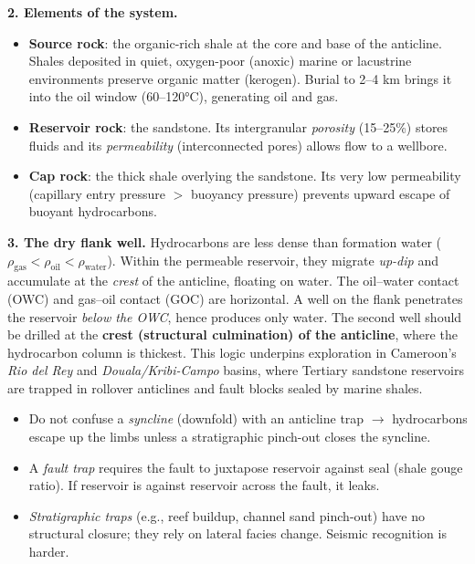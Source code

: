 \documentclass[11pt]{article}
\begin{document}
\begin{exoresolu}
\textbf{2. Elements of the system.}
\begin{itemize}
\item \textbf{Source rock}: the organic-rich shale at the core and base of the anticline. Shales deposited in quiet, oxygen-poor (anoxic) marine or lacustrine environments preserve organic matter (kerogen). Burial to 2--4 km brings it into the oil window (60--120°C), generating oil and gas.
\item \textbf{Reservoir rock}: the sandstone. Its intergranular \emph{porosity} (15--25\%) stores fluids and its \emph{permeability} (interconnected pores) allows flow to a wellbore.
\item \textbf{Cap rock}: the thick shale overlying the sandstone. Its very low permeability (capillary entry pressure $>$ buoyancy pressure) prevents upward escape of buoyant hydrocarbons.
\end{itemize}

\textbf{3. The dry flank well.} Hydrocarbons are less dense than formation water ($\rho_{\text{gas}} < \rho_{\text{oil}} < \rho_{\text{water}}$). Within the permeable reservoir, they migrate \emph{up-dip} and accumulate at the \emph{crest} of the anticline, floating on water. The oil--water contact (OWC) and gas--oil contact (GOC) are horizontal. A well on the flank penetrates the reservoir \emph{below the OWC}, hence produces only water. The second well should be drilled at the \textbf{crest (structural culmination) of the anticline}, where the hydrocarbon column is thickest. This logic underpins exploration in Cameroon's \emph{Rio del Rey} and \emph{Douala/Kribi-Campo} basins, where Tertiary sandstone reservoirs are trapped in rollover anticlines and fault blocks sealed by marine shales.
\end{exoresolu}

\begin{attention}
\begin{itemize}
\item Do not confuse a \emph{syncline} (downfold) with an anticline trap $\rightarrow$ hydrocarbons escape up the limbs unless a stratigraphic pinch-out closes the syncline.
\item A \emph{fault trap} requires the fault to juxtapose reservoir against seal (shale gouge ratio). If reservoir is against reservoir across the fault, it leaks.
\item \emph{Stratigraphic traps} (e.g., reef buildup, channel sand pinch-out) have no structural closure; they rely on lateral facies change. Seismic recognition is harder.
\end{itemize}
\end{attention}
\end{document}
